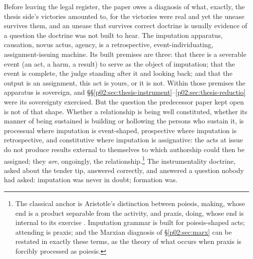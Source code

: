 \documentclass[11pt,a4paper]{article}
\begin{document}
Before leaving the legal register, the paper owes a diagnosis of what, exactly, the thesis side's victories amounted to, for the victories were real and yet the unease survives them, and an unease that survives correct doctrine is usually evidence of a question the doctrine was not built to hear. The imputation apparatus, causation, novus actus, agency, is a retrospective, event-individuating, assignment-issuing machine. Its built premises are three: that there is a severable event (an act, a harm, a result) to serve as the object of imputation; that the event is complete, the judge standing after it and looking back; and that the output is an assignment, this act is yours, or it is not. Within those premises the apparatus is sovereign, and \S\S\ref{p02:sec:thesis-instrument}--\ref{p02:sec:thesis-reductio} were its sovereignty exercised. But the question the predecessor paper kept open is not of that shape. Whether a relationship is being well constituted, whether its manner of being sustained is building or hollowing the persons who sustain it, is processual where imputation is event-shaped, prospective where imputation is retrospective, and constitutive where imputation is assignative: the acts at issue do not produce results external to themselves to which authorship could then be assigned; they \emph{are}, ongoingly, the relationship.\footnote{The classical anchor is Aristotle's distinction between poiesis, making, whose end is a product separable from the activity, and praxis, doing, whose end is internal to its exercise \parencite[VI.4--5]{aristotle2009nicomachean}. Imputation grammar is built for poiesis-shaped acts; attending is praxis; and the Marxian diagnosis of \S\ref{p02:sec:marx} can be restated in exactly these terms, as the theory of what occurs when praxis is forcibly processed as poiesis.} The instrumentality doctrine, asked about the tender tip, answered correctly, and answered a question nobody had asked: imputation was never in doubt; formation was.
\end{document}
